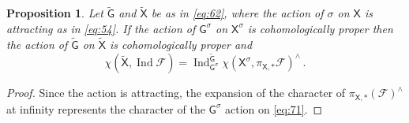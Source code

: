 \documentclass[14pt]{extarticle}
\newcommand{\bG}{\mathsf{G}}
\newcommand{\bX}{\mathsf{X}}
\newcommand{\cF}{\mathscr{F}}
\DeclareMathOperator{\Ind}{Ind}
\newtheorem{Proposition}[Lemma]{Proposition}
\theoremstyle{definition}
\begin{document}
\begin{Proposition}\label{p_attr_lift}
Let $\widetilde{\bG}$ and $\widetilde{\bX}$ be as in \eqref{eq:62},
where the action of $\sigma$ on $\bX$ is attracting as in
\eqref{eq:54}.
If the action of $\bG^\sigma$ on
$\bX^\sigma$ is cohomologically proper then the action of $\widetilde{\bG}$ on
$\widetilde{\bX}$ is cohomologically proper and 
\[
  \chi(\widetilde{\bX}, \Ind \cF) = \Ind^{\widetilde{\bG}}_{\bG^\sigma}
\chi(\bX^\sigma,
\pi_{\bX,*} \cF)^\wedge \,. 
\]
\end{Proposition}


\begin{proof}
  Since the action is attracting, the expansion of the character of
  $\pi_{\bX,*}(\cF)^\wedge$ at infinity represents the character of
  the $\bG^\sigma$ action on \eqref{eq:71}. 
%
\end{proof}






\end{document}
